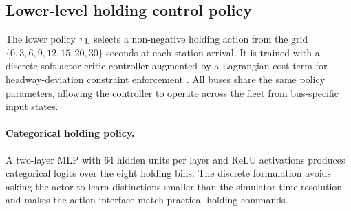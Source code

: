 \subsection{Lower-level holding control policy}
\label{sec:lower}

The lower policy $\pi_{\mathrm{L}}$ selects a non-negative holding action from the grid $\{0,3,6,9,12,15,20,30\}$ seconds at each station arrival.
It is trained with a discrete soft actor-critic controller augmented by a Lagrangian cost term for headway-deviation constraint enforcement \citep{haarnoja2018soft}.
All buses share the same policy parameters, allowing the controller to operate across the fleet from bus-specific input states.

\paragraph{Categorical holding policy.}
A two-layer MLP with 64 hidden units per layer and ReLU activations produces categorical logits over the eight holding bins. The discrete formulation avoids asking the actor to learn distinctions smaller than the simulator time resolution and makes the action interface match practical holding commands.


